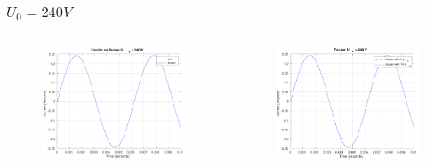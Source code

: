 \documentclass[aspectratio=1610]{beamer}
\begin{document}
\begin{frame}
\frametitle{$U_{0}= 240V$}
	\begin{columns}
			\begin{figure}
				\includegraphics[scale=0.25]{figs/fourier vs rk4 240.png}
			\end{figure}
			\begin{figure}
				\includegraphics[scale=0.25]{figs/fourier comparison 240.png}
			\end{figure}
	\end{columns}
\end{frame}
\end{document}
